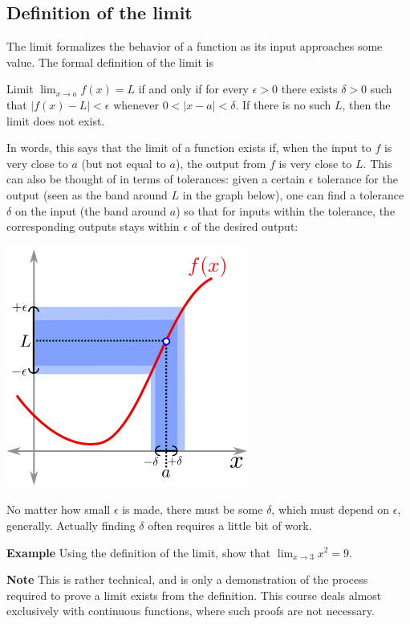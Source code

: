 \documentclass[a4paper]{book}
\begin{document}
\begin{sloppypar}
\subsection{Definition of the limit}
The limit formalizes the behavior of a function as its input approaches some value. The formal definition of the limit is
\begin{examplebox}
Limit $\displaystyle \lim_{x \rightarrow a} f(x) = L$ if and only if for every $\epsilon>0$ there exists $\delta>0$ such that $|f(x)-L|<\epsilon$ whenever $0<|x-a|<\delta$. If there is no such $L$, then the limit does not exist.
\end{examplebox}
In words, this says that the limit of a function exists if, when the input to $f$ is very close to $a$ (but not equal to $a$), the output from $f$ is very close to $L$. This can also be thought of in terms of tolerances: given a certain $\epsilon$ tolerance for the output (seen as the band around $L$ in the graph below), one can find a tolerance $\delta$ on the input (the band around $a$) so that for inputs within the tolerance, the corresponding outputs stays within $\epsilon$ of the desired output:
\begin{center}\includegraphics[scale=0.6]{Limit}\end{center}

No matter how small $\epsilon$ is made, there must be some $\delta$, which must depend on $\epsilon$, generally. Actually finding $\delta$ often requires a little bit of work.

\textbf{Example} Using the definition of the limit, show that $\displaystyle \lim_{x \rightarrow 3} x^2 = 9$. 
\begin{examplebox}
\textbf{Note} This is rather technical, and is only a demonstration of the process required to prove a limit exists from the definition. This course deals almost exclusively with continuous functions, where such proofs are not necessary.


\end{examplebox}
\end{sloppypar}
\end{document}
